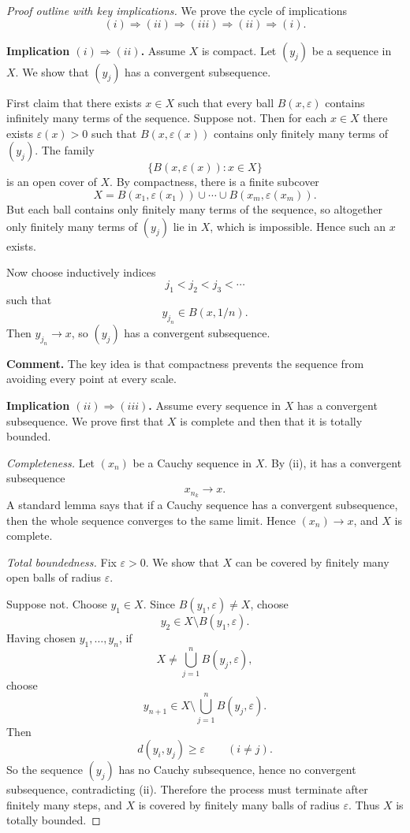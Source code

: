 \documentclass[12pt]{article}
\begin{document}
\begin{proof}[Proof outline with key implications]
We prove the cycle of implications
\[
(i)\Rightarrow(ii)\Rightarrow(iii)\Rightarrow(ii)\Rightarrow(i).
\]

\medskip

\noindent\textbf{Implication $(i)\Rightarrow(ii)$.}
Assume $X$ is compact. Let $(y_j)$ be a sequence in $X$. We show that $(y_j)$ has a convergent subsequence.

First claim that there exists $x\in X$ such that every ball $B(x,\varepsilon)$ contains infinitely many terms of the sequence. Suppose not. Then for each $x\in X$ there exists $\varepsilon(x)>0$ such that $B(x,\varepsilon(x))$ contains only finitely many terms of $(y_j)$. The family
\[
\{B(x,\varepsilon(x)) : x\in X\}
\]
is an open cover of $X$. By compactness, there is a finite subcover
\[
X=B(x_1,\varepsilon(x_1))\cup\cdots\cup B(x_m,\varepsilon(x_m)).
\]
But each ball contains only finitely many terms of the sequence, so altogether only finitely many terms of $(y_j)$ lie in $X$, which is impossible. Hence such an $x$ exists.

Now choose inductively indices
\[
j_1<j_2<j_3<\cdots
\]
such that
\[
y_{j_n}\in B(x,1/n).
\]
Then $y_{j_n}\to x$, so $(y_j)$ has a convergent subsequence.

\medskip

\noindent\textbf{Comment.} The key idea is that compactness prevents the sequence from avoiding every point at every scale.

\medskip

\noindent\textbf{Implication $(ii)\Rightarrow(iii)$.}
Assume every sequence in $X$ has a convergent subsequence. We prove first that $X$ is complete and then that it is totally bounded.

\smallskip

\noindent\emph{Completeness.}
Let $(x_n)$ be a Cauchy sequence in $X$. By (ii), it has a convergent subsequence
\[
x_{n_k}\to x.
\]
A standard lemma says that if a Cauchy sequence has a convergent subsequence, then the whole sequence converges to the same limit. Hence $(x_n)\to x$, and $X$ is complete.

\smallskip

\noindent\emph{Total boundedness.}
Fix $\varepsilon>0$. We show that $X$ can be covered by finitely many open balls of radius $\varepsilon$.

Suppose not. Choose $y_1\in X$. Since $B(y_1,\varepsilon)\neq X$, choose
\[
y_2\in X\setminus B(y_1,\varepsilon).
\]
Having chosen $y_1,\dots,y_n$, if
\[
X\neq \bigcup_{j=1}^n B(y_j,\varepsilon),
\]
choose
\[
y_{n+1}\in X\setminus \bigcup_{j=1}^n B(y_j,\varepsilon).
\]
Then
\[
d(y_i,y_j)\ge \varepsilon \qquad (i\neq j).
\]
So the sequence $(y_j)$ has no Cauchy subsequence, hence no convergent subsequence, contradicting (ii). Therefore the process must terminate after finitely many steps, and $X$ is covered by finitely many balls of radius $\varepsilon$. Thus $X$ is totally bounded.


\end{proof}
\end{document}
